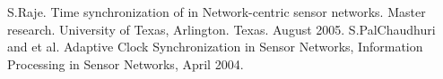 \documentclass[journal]{IEEEtran}
\begin{document}
\begin{thebibliography}{\textbf{References}}
S.Raje. Time synchronization of in Network-centric sensor networks. Master research. University of Texas, Arlington. Texas. August 2005.
S.PalChaudhuri and et al. Adaptive Clock Synchronization in Sensor Networks, Information Processing in Sensor Networks, April 2004.
\end{thebibliography}
\end{document}
